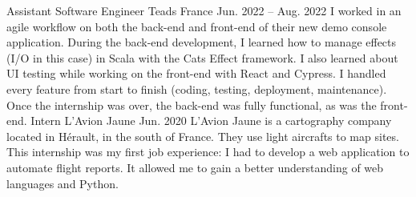 \documentclass[11pt]{spidercv}
\begin{document}
\begin{MainPart}
  \Experience
  {\ColorHighlight}
  {Assistant Software Engineer}
  {Teads France}
  {Jun. 2022 -- Aug. 2022}{
    I worked in an agile workflow on both the back-end and front-end of their new demo console application. During the back-end development, I learned how to manage effects (I/O in this case) in Scala with the Cats Effect framework. I also learned about UI testing while working on the front-end with React and Cypress. I handled every feature from start to finish (coding, testing, deployment, maintenance). Once the internship was over, the back-end was fully functional, as was the front-end.
  }
  \Experience
  {\ColorHighlight}
  {Intern}
  {L'Avion Jaune}
  {Jun. 2020}
  {
    L'Avion Jaune is a cartography company located in Hérault, in the south of France. They use light aircrafts to map sites. This internship was my first job experience: I had to develop a web application to automate flight reports. It allowed me to gain a better understanding of web languages and Python.
  }

\end{MainPart}
\end{document}
